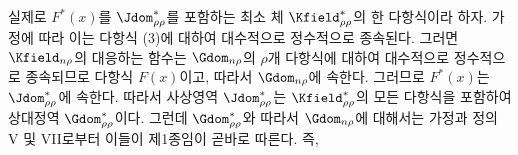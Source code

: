 
실제로 $F^*(x)$를 $\Jdom^*_{\rho\rho}$를 포함하는 최소 체 $\Kfield^*_{\rho\rho}$의 한 다항식이라 하자. 가정에 따라 이는 다항식 (3)에 대하여 대수적으로 정수적으로 종속된다. 그러면 $\Kfield_{n\rho}$의 대응하는 함수는 $\Gdom_{n\rho}$의 $\rho$개 다항식에 대하여 대수적으로 정수적으로 종속되므로 다항식 $F(x)$이고, 따라서 $\Gdom_{n\rho}$에 속한다. 그러므로 $F^*(x)$는 $\Jdom^*_{\rho\rho}$에 속한다. 따라서 사상영역 $\Jdom^*_{\rho\rho}$는 $\Kfield^*_{\rho\rho}$의 모든 다항식을 포함하여 상대정역 $\Gdom^*_{\rho\rho}$이다. 그런데 $\Gdom^*_{\rho\rho}$와 따라서 $\Gdom_{n\rho}$에 대해서는 가정과 정의 V 및 VII로부터 이들이 제1종임이 곧바로 따른다. 즉,
